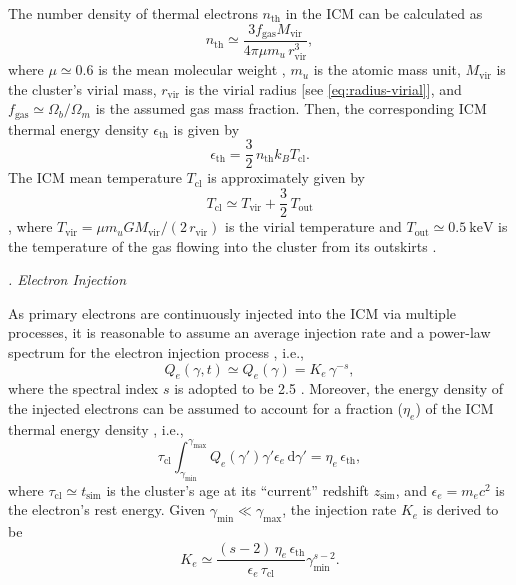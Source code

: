 \documentclass[twocolumn]{aastex62}
\newcommand{\R}[1]{\mathrm{#1}}
\newcommand{\D}[1]{\R{d} #1}
\newcounter{sssseccount}
\newcommand{\sssseclabel}{\alph{sssseccount}}
\newcommand{\ssssec}[1]{%
  \vspace{1ex}%
  \stepcounter{sssseccount}%
  \noindent\emph{\sssseclabel. #1}%
}
\begin{document}
The number density of thermal electrons $n_{\R{th}}$ in the ICM can be
calculated as
\begin{equation}
  \label{eq:n-th}
  n_{\R{th}} \simeq
    \frac{3 f_{\R{gas}} M_{\R{vir}}}{4\pi \mu m_u \,r^3_{\R{vir}}},
\end{equation}
where
$\mu \simeq 0.6$ is the mean molecular weight \citep[e.g.,][]{ettori2013},
$m_u$ is the atomic mass unit,
$M_{\R{vir}}$ is the cluster's virial mass,
$r_{\R{vir}}$ is the virial radius [see \autoref{eq:radius-virial}],
and
$f_{\R{gas}} \simeq \Omega_b/\Omega_m$ is the assumed gas mass fraction.
Then, the corresponding ICM thermal energy density $\epsilon_{\R{th}}$
is given by
\begin{equation}
  \label{eq:e-th}
  \epsilon_{\R{th}} = \frac{3}{2} \,n_{\R{th}} k_B T_{\R{cl}}.
\end{equation}
The ICM mean temperature $T_{\R{cl}}$ is approximately given by
\begin{equation}
  \label{eq:t-icm}
  T_{\R{cl}} \simeq T_{\R{vir}} + \frac{3}{2} \,T_{\R{out}}
\end{equation}
\citep{cavaliere1998},
where
$T_{\R{vir}} = \mu m_u G M_{\R{vir}} / (2 \,r_{\R{vir}})$ is the virial
temperature and $T_{\R{out}} \simeq \SI{0.5}{\keV}$ is the temperature
of the gas flowing into the cluster from its outskirts \citep{fujita2003}.

\ssssec{Electron Injection}

As primary electrons are continuously injected into the ICM via multiple
processes, it is reasonable to assume an average injection rate and a
power-law spectrum for the electron injection process
\citep[e.g.,][]{cassano2005,donnert2014}, i.e.,
\begin{equation}
  \label{eq:electron-inj}
  Q_e(\gamma, t) \simeq Q_e(\gamma) = K_e \,\gamma^{-s},
\end{equation}
where the spectral index $s$ is adopted to be 2.5 \citep{cassano2005}.
Moreover, the energy density of the injected electrons can be assumed to
account for a fraction ($\eta_e$) of the ICM thermal energy density
\citep{cassano2005}, i.e.,
\begin{equation}
  \tau_{\R{cl}} \int_{\gamma_{\R{min}}}^{\gamma_{\R{max}}}
  Q_e(\gamma') \gamma'\epsilon_e \,\D{\gamma'}
  = \eta_e \,\epsilon_{\R{th}},
\end{equation}
where $\tau_{\R{cl}} \simeq t_{\R{sim}}$ is the cluster's age at its
\enquote{current} redshift $z_{\R{sim}}$,
and $\epsilon_e = m_e c^2$ is the electron's rest energy.
Given $\gamma_{\R{min}} \ll \gamma_{\R{\max}}$, the injection rate $K_e$
is derived to be
\begin{equation}
  \label{eq:injrate}
  K_e \simeq \frac{(s-2)\,\eta_e\,\epsilon_{\R{th}}}{\epsilon_e\,\tau_{\R{cl}}}
    \gamma_{\R{min}}^{s-2}.
\end{equation}
\end{document}
